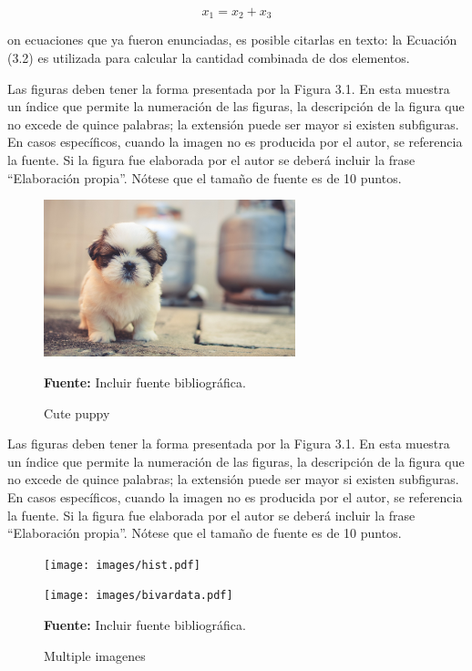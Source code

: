 \begin{equation}
	x_1 = x_2 + x_3
\end{equation}

on ecuaciones que ya fueron enunciadas, es posible citarlas en texto: la Ecuación (3.2) es utilizada para calcular la cantidad combinada de dos elementos.

Las figuras deben tener la forma presentada por la Figura 3.1. En esta muestra un índice que permite la numeración de las figuras, la descripción de la figura que no excede de quince palabras; la extensión puede ser mayor si existen subfiguras. En casos específicos, cuando la imagen no es producida por el autor, se referencia la fuente. Si la figura fue elaborada por el autor se deberá incluir la frase “Elaboración propia”. Nótese que el tamaño de fuente es de 10 puntos.

\begin{figure}
	\centering
	\includegraphics[width=0.65\textwidth]{images/puppy_dog_cute.jpg}
	\caption{Cute puppy} \vspace{-0.2cm}
	\footnotesize{\textbf{Fuente:} Incluir fuente bibliográfica.}
	\label{pics:Puppy} 
\end{figure}


Las figuras deben tener la forma presentada por la Figura 3.1. En esta muestra un índice que permite la numeración de las figuras, la descripción de la figura que no excede de quince palabras; la extensión puede ser mayor si existen subfiguras. En casos específicos, cuando la imagen no es producida por el autor, se referencia la fuente. Si la figura fue elaborada por el autor se deberá incluir la frase “Elaboración propia”. Nótese que el tamaño de fuente es de 10 puntos.
\begin{figure}
	\begin{minipage}[t]{0.48\textwidth}
		\texttt{[image: images/hist.pdf]}
	\end{minipage}
	\hfill
	\begin{minipage}[t]{0.48\textwidth}
		\texttt{[image: images/bivardata.pdf]}
	\end{minipage}
	\caption{Multiple imagenes}
	\centering \vspace{-0.2cm}
	\footnotesize{\textbf{Fuente:} Incluir fuente bibliográfica.}
	\label{pics:data}
\end{figure}

